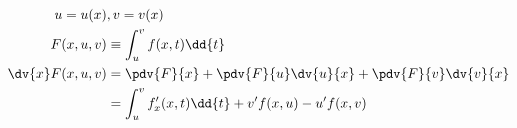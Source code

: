 \begin{align*}
	u =u(x) &, v = v(x)
	\\
	F(x,u,v) &\equiv \int_u^v f(x,t) \dd{t}
	\\
	\dv{x} F(x,u,v) &= \pdv{F}{x} + \pdv{F}{u} \dv{u}{x} + \pdv{F}{v} \dv{v}{x}
	\\
	&= \int_u^v f_x'(x,t) \dd{t} + v'f(x,u) - u'f(x,v)
\end{align*}
